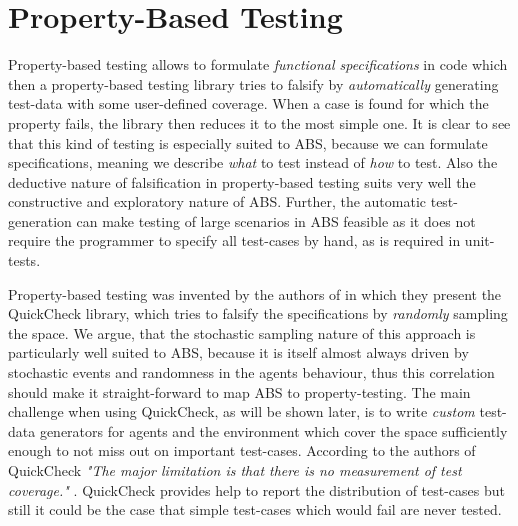 \section{Property-Based Testing}
\label{sec:proptesting}

Property-based testing allows to formulate \textit{functional specifications} in code which then a property-based testing library tries to falsify by \textit{automatically} generating test-data with some user-defined coverage. When a case is found for which the property fails, the library then reduces it to the most simple one. It is clear to see that this kind of testing is especially suited to ABS, because we can formulate specifications, meaning we describe \textit{what} to test instead of \textit{how} to test. Also the deductive nature of falsification in property-based testing suits very well the constructive and exploratory nature of ABS. Further, the automatic test-generation can make testing of large scenarios in ABS feasible as it does not require the programmer to specify all test-cases by hand, as is required in unit-tests.

Property-based testing was invented by the authors of \cite{claessen_quickcheck:_2000, claessen_testing_2002} in which they present the QuickCheck library, which tries to falsify the specifications by \textit{randomly} sampling the space. We argue, that the stochastic sampling nature of this approach is particularly well suited to ABS, because it is itself almost always driven by stochastic events and randomness in the agents behaviour, thus this correlation should make it straight-forward to map ABS to property-testing. The main challenge when using QuickCheck, as will be shown later, is to write \textit{custom} test-data generators for agents and the environment which cover the space sufficiently enough to not miss out on important test-cases. According to the authors of QuickCheck \textit{"The major limitation is that there is no measurement of test coverage."} \cite{claessen_quickcheck:_2000}. QuickCheck provides help to report the distribution of test-cases but still it could be the case that simple test-cases which would fail are never tested.

